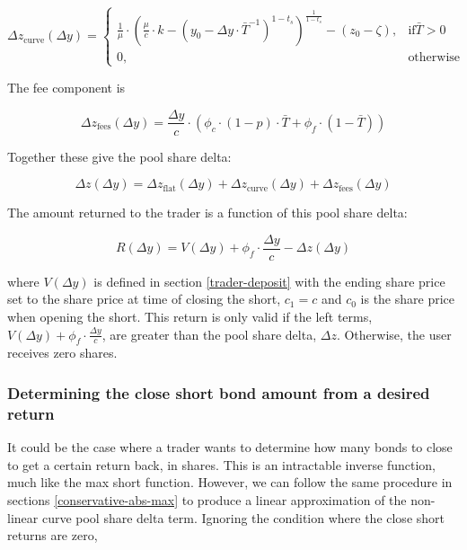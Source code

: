 \begin{equation}\label{close-short-curve}
\Delta z_{\text{curve}}(\Delta y) =
\begin{cases}
    \frac{1}{\mu} \cdot \left( \frac{\mu}{c} \cdot k - \left( y_0 - \Delta y \cdot \bar{T}^{-1} \right)^{1-t_s} \right)^{\frac{1}{1 - t_s}} - (z_{0} - \zeta) , & \text{if} \bar{T} > 0 \\
    0, & \text{otherwise}
\end{cases}
\end{equation}

The fee component is

\begin{equation}\label{close-short-fees}
\Delta z_{\text{fees}}(\Delta y) =  \frac{\Delta y}{c} \cdot \left( \phi_c \cdot (1 - p) \cdot \bar{T} + \phi_f \cdot (1 - \bar{T}) \right)
\end{equation}

Together these give the pool share delta:

\begin{equation}\label{close-short-shares-returend}
\Delta z(\Delta y) = \Delta z_{\text{flat}}(\Delta y) + \Delta z_{\text{curve}}(\Delta y) + \Delta z_{\text{fees}}(\Delta y)
\end{equation}

The amount returned to the trader is a function of this pool share delta:

\begin{equation}\label{close-short-trader-return}
    R(\Delta y) =  V(\Delta y) + \phi_f \cdot \frac{\Delta y}{c} - \Delta z(\Delta y)
\end{equation}

where $V(\Delta y)$ is defined in section \ref{trader-deposit} with the ending share price set to the share price at time of closing the short, $c_1 = c$ and $c_0$ is the share price when opening the short.
This return is only valid if the left terms, $V(\Delta y) + \phi_f \cdot \frac{\Delta y}{c}$, are greater than the pool share delta, $\Delta z$.
Otherwise, the user receives zero shares.

\subsubsection{Determining the close short bond amount from a desired return}
It could be the case where a trader wants to determine how many bonds to close to get a certain return back, in shares.
This is an intractable inverse function, much like the max short function.
However, we can follow the same procedure in sections \ref{conservative-abs-max} to produce a linear approximation of the non-linear curve pool share delta term.
Ignoring the condition where the close short returns are zero,

